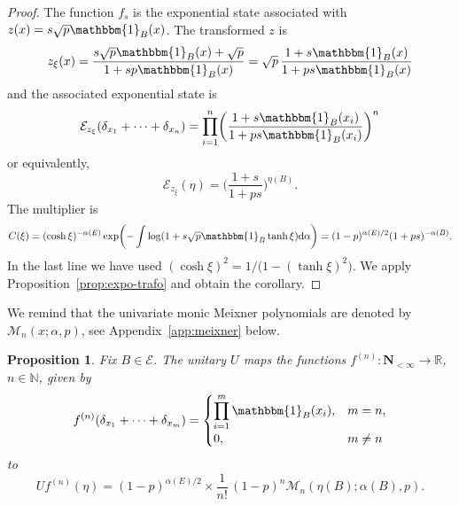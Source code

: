 \documentclass[10pt,a4paper]{amsart}
\numberwithin{equation}{section}
\newtheorem{Proposition}[Theorem]{Proposition}
 { \theoremstyle{definition}
\newtheorem{Definition}[Theorem]{Definition}
\newtheorem{Example}[Theorem]{Example}
\newtheorem{Remark}[Theorem]{Remark}
}
\newcommand{\N}{\mathbb{N}}
\newcommand{\R}{\mathbb{R}}
\newcommand{\dd}{\mathrm{d}} %
\newcommand{\1}{\mathbbm{1}}
\begin{document}
\begin{proof}
	The function $f_s$ is the exponential state associated with $z(x) = s \sqrt p \1_B(x)$. The transformed $z$ is
	\[
		z_\xi(x) =\frac{s\sqrt p \1_B(x) + \sqrt p}{1+s p \1_B(x)} = \sqrt p\, \frac{1+s \1_B (x)}{1+ps\1_B (x)}
	\]
	and the associated exponential state is
	\[
		\mathcal E_{z_\xi}(\delta_{x_1}+\cdots +\delta_{x_n})
		= \prod_{i=1}^n \biggl( \frac{1+s \1_B (x_i)}{1+ps\1_B (x_i)}\biggr)^n
	\] 	
	or equivalently,
	\[
		\mathcal E_{z_\xi}(\eta)
		= \biggl( \frac{1+s}{1+ps}\biggr)^{\eta(B)}.
	\] 	
	The multiplier is
	\begin{align*}
	 C(\xi) = (\cosh \xi)^{-\alpha(E)} \exp\biggl( - \int \log (1+ s\sqrt p \1_B \tanh \xi )\dd\alpha\biggr)
	 = (1- p)^{\alpha(E)/2} ( 1+ ps)^{-\alpha(B)}.
	\end{align*}
	In the last line we have used $(\cosh \xi)^2 = 1/\bigl(1- (\tanh \xi)^2\bigr)$. We apply Proposition~\ref{prop:expo-trafo} and obtain the corollary.
\end{proof}


We remind %
that the univariate monic Meixner polynomials are denoted by $\mathcal{M}_n(x; \alpha, p)$, see Appendix~\ref{app:meixner} below.

\begin{Proposition} \label{prop:meixner}
	Fix $B\in \mathcal E$.
	The unitary $U$ maps the functions $f^{(n)}\colon \mathbf N_{<\infty}\to \R$, $n\in \N$, given by
	\[
		f^{(n)}(\delta_{x_1}+\cdots + \delta_{x_m}) = \begin{cases}
			\displaystyle \prod_{i=1}^m \1_B(x_i), & m =n,\\
			 0,& m\neq n
			\end{cases}
	\]
	to
	\[
		U f^{(n)} (\eta) = (1-p)^{\alpha(E)/2}\times \frac{1}{n!}\, (1-p)^n \mathcal M_n(\eta(B);\alpha(B),p).
	\]
\end{Proposition}
\end{document}
